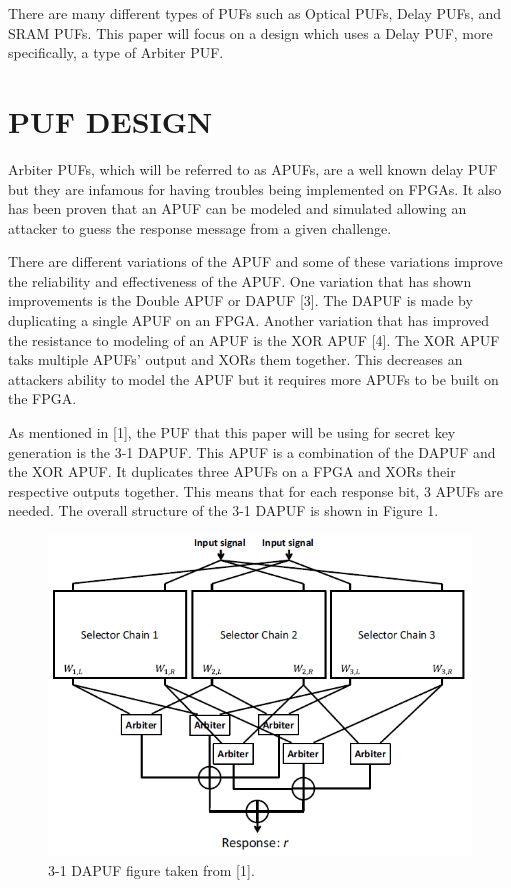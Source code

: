 \documentclass[letterpaper, 10 pt, conference]{ieeeconf}  %
\begin{document}
There are many different types of PUFs such as Optical PUFs, Delay PUFs, and SRAM PUFs.  This paper will focus on a design which uses a Delay PUF, more specifically, a type of Arbiter PUF.

\section{PUF DESIGN}

Arbiter PUFs, which will be referred to as APUFs, are a well known delay PUF but they are infamous for having troubles being implemented on FPGAs.  It also has been proven that an APUF can be modeled and simulated allowing an attacker to guess the response message from a given challenge.

There are different variations of the APUF and some of these variations improve the reliability and effectiveness of the APUF.  One variation that has shown improvements is the Double APUF or DAPUF [3].  The DAPUF is made by duplicating a single APUF on an FPGA.  Another variation that has improved the resistance to modeling of an APUF is the XOR APUF [4].  The XOR APUF taks multiple APUFs' output and XORs them together.  This decreases an attackers ability to model the APUF but it requires more APUFs to be built on the FPGA.

As mentioned in [1], the PUF that this paper will be using for secret key generation is the 3-1 DAPUF.  This APUF is a combination of the DAPUF and the XOR APUF.  It duplicates three APUFs on a FPGA and XORs their respective outputs together.  This means that for each response bit, 3 APUFs are needed.  The overall structure of the 3-1 DAPUF is shown in Figure 1.

\begin{figure}[thpb]
	\centering
	\includegraphics[scale=.50]{DAPUF}
   \caption{3-1 DAPUF figure taken from [1].}
\end{figure}
\end{document}
